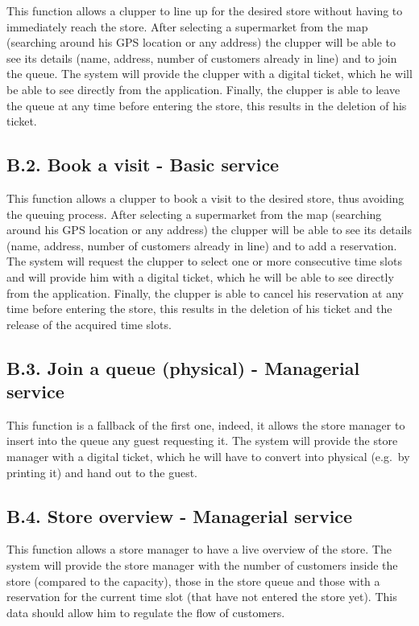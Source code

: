 This function allows a clupper to line up for the desired store without having to immediately reach the store. After selecting a supermarket from the map (searching around his GPS location or any address) the clupper will be able to see its details (name, address, number of customers already in line) and to join the queue. The system will provide the clupper with a digital ticket, which he will be able to see directly from the application. Finally, the clupper is able to leave the queue at any time before entering the store, this results in the deletion of his ticket.

\subsection{B.2. Book a visit - Basic service}

This function allows a clupper to book a visit to the desired store, thus avoiding the queuing process. After selecting a supermarket from the map (searching around his GPS location or any address) the clupper will be able to see its details (name, address, number of customers already in line) and to add a reservation. The system will request the clupper to select one or more consecutive time slots and will provide him with a digital ticket, which he will be able to see directly from the application. Finally, the clupper is able to cancel his reservation at any time before entering the store, this results in the deletion of his ticket and the release of the acquired time slots.

\subsection{B.3. Join a queue (physical) - Managerial service}

This function is a fallback of the first one, indeed, it allows the store manager to insert into the queue any guest requesting it. The system will provide the store manager with a digital ticket, which he will have to convert into physical (e.g.~by printing it) and hand out to the guest.

\subsection{B.4. Store overview - Managerial service}

This function allows a store manager to have a live overview of the store. The system will provide the store manager with the number of customers inside the store (compared to the capacity), those in the store queue and those with a reservation for the current time slot (that have not entered the store yet). This data should allow him to regulate the flow of customers.

